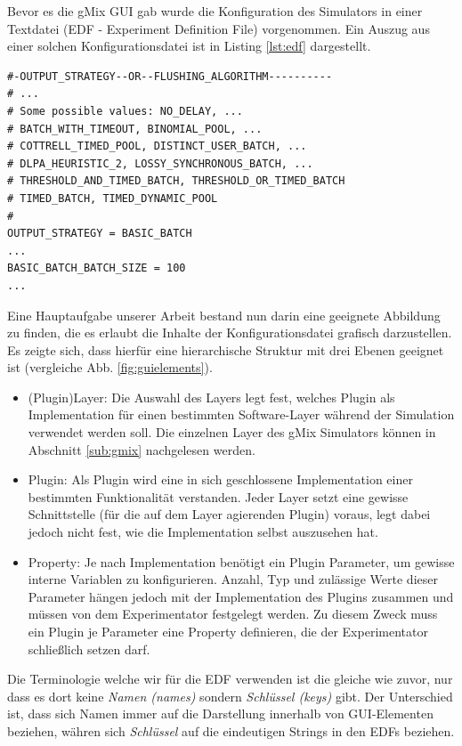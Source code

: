 \documentclass[a4paper, 11pt]{article} %
\begin{document}
Bevor es die gMix GUI gab wurde die Konfiguration des Simulators in einer Textdatei (EDF - Experiment Definition File) vorgenommen. Ein Auszug aus einer solchen Konfigurationsdatei ist in Listing \ref{lst:edf} dargestellt. 

\newpage

\begin{lstlisting}[caption={Auszug aus einer Simulator Konfiguration},label=lst:edf,frame=lrtb]
#-OUTPUT_STRATEGY--OR--FLUSHING_ALGORITHM----------
# ...
# Some possible values: NO_DELAY, ... 
# BATCH_WITH_TIMEOUT, BINOMIAL_POOL, ... 
# COTTRELL_TIMED_POOL, DISTINCT_USER_BATCH, ... 
# DLPA_HEURISTIC_2, LOSSY_SYNCHRONOUS_BATCH, ...
# THRESHOLD_AND_TIMED_BATCH, THRESHOLD_OR_TIMED_BATCH 
# TIMED_BATCH, TIMED_DYNAMIC_POOL
#	
OUTPUT_STRATEGY = BASIC_BATCH
...
BASIC_BATCH_BATCH_SIZE = 100
...
\end{lstlisting}

Eine Hauptaufgabe unserer Arbeit bestand nun darin eine geeignete Abbildung zu finden, die es erlaubt die Inhalte der Konfigurationsdatei grafisch darzustellen. Es zeigte sich, dass hierfür eine hierarchische Struktur mit drei Ebenen geeignet ist (vergleiche Abb. \ref{fig:guielements}).

\begin{itemize}
	\item (Plugin)Layer: Die Auswahl des Layers legt fest, welches Plugin als Implementation für einen bestimmten Software-Layer während der Simulation verwendet werden soll. Die einzelnen Layer des gMix Simulators können in Abschnitt \ref{sub:gmix} nachgelesen werden. 
	\item Plugin: Als Plugin wird eine in sich geschlossene Implementation einer bestimmten Funktionalität verstanden. Jeder Layer setzt eine gewisse Schnittstelle (für die auf dem Layer agierenden Plugin) voraus, legt dabei jedoch nicht fest, wie die Implementation selbst auszusehen hat.
	\item Property: Je nach Implementation benötigt ein Plugin Parameter, um gewisse interne Variablen zu konfigurieren. Anzahl, Typ und zulässige Werte dieser Parameter hängen jedoch mit der Implementation des Plugins zusammen und müssen von dem Experimentator festgelegt werden. Zu diesem Zweck muss ein Plugin je Parameter eine Property definieren, die der Experimentator schließlich setzen darf.
\end{itemize} 

Die Terminologie welche wir für die EDF verwenden ist die gleiche wie zuvor, nur dass es dort keine \emph{Namen (names)} sondern \emph{Schlüssel (keys)} gibt. Der Unterschied ist, dass sich Namen immer auf die Darstellung innerhalb von GUI-Elementen beziehen, währen sich \emph{Schlüssel} auf die eindeutigen Strings in den EDFs beziehen.
\end{document}
